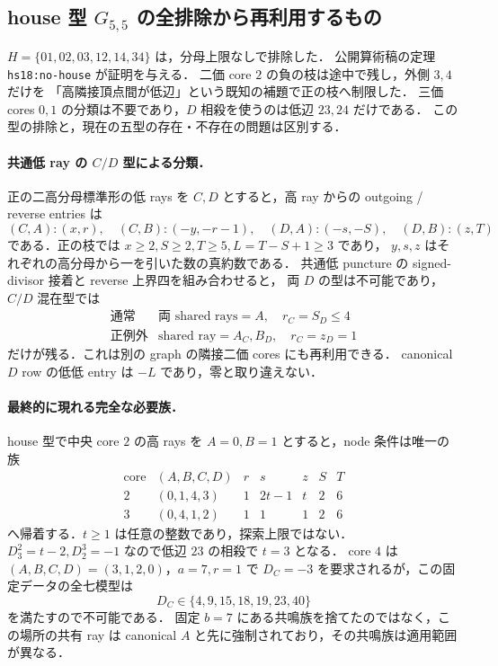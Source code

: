 \subsection{house 型 \texorpdfstring{$G_{5,5}$}{G5,5} の全排除から再利用するもの}
\label{nh18:house}

$H=\{01,02,03,12,14,34\}$ は，分母上限なしで排除した．
公開算術稿の定理 \texttt{hs18:no-house} が証明を与える．
二価 core $2$ の負の枝は途中で残し，外側 $3,4$ だけを
「高隣接頂点間が低辺」という既知の補題で正の枝へ制限した．
三価 cores $0,1$ の分類は不要であり，$D$ 相殺を使うのは低辺 $23,24$ だけである．
この型の排除と，現在の五型の存在・不存在の問題は区別する．

\paragraph{共通低 ray の $C/D$ 型による分類．}
正の二高分母標準形の低 rays を $C,D$ とすると，高 ray からの
outgoing / reverse entries は
\[
 (C,A):(x,r),\quad(C,B):(-y,-r-1),\quad
 (D,A):(-s,-S),\quad(D,B):(z,T)
\]
である．正の枝では $x\ge2,S\ge2,T\ge5,L=T-S+1\ge3$ であり，
$y,s,z$ はそれぞれの高分母から一を引いた数の真約数である．
共通低 puncture の signed-divisor 接着と reverse 上界四を組み合わせると，
両 $D$ の型は不可能であり，$C/D$ 混在型では
\[
 \begin{array}{c|c}
 \text{通常}&\text{両 shared rays}=A,\quad r_C=S_D\le4\\
 \text{正例外}&\text{shared ray}=A_C,B_D,\quad r_C=z_D=1
 \end{array}
\]
だけが残る．これは別の graph の隣接二価 cores にも再利用できる．
canonical $D$ row の低低 entry は $-L$ であり，零と取り違えない．

\paragraph{最終的に現れる完全な必要族．}
house 型で中央 core $2$ の高 rays を $A=0,B=1$ とすると，node 条件は唯一の族
\[
 \begin{array}{c|c|ccccc}
 \text{core}&(A,B,C,D)&r&s&z&S&T\\\hline
 2&(0,1,4,3)&1&2t-1&t&2&6\\
 3&(0,4,1,2)&1&1&1&2&6
 \end{array}
\]
へ帰着する．$t\ge1$ は任意の整数であり，探索上限ではない．
$D^2_3=t-2,D^3_2=-1$ なので低辺 $23$ の相殺で $t=3$ となる．
core $4$ は $(A,B,C,D)=(3,1,2,0)$，$a=7,r=1$ で
$D_C=-3$ を要求されるが，この固定データの全七模型は
\[
 D_C\in\{4,9,15,18,19,23,40\}
\]
を満たすので不可能である．
固定 $b=7$ にある共鳴族を捨てたのではなく，この場所の共有 ray は
canonical $A$ と先に強制されており，その共鳴族は適用範囲が異なる．

